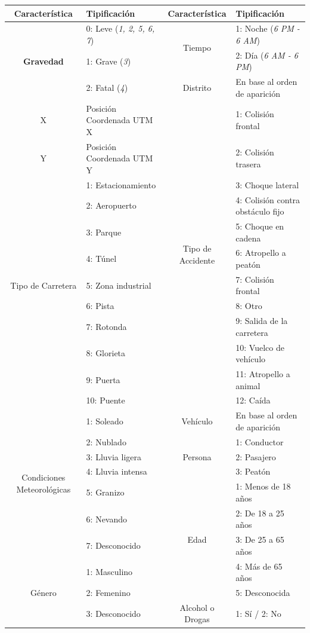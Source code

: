 \documentclass{uathesis-es}
\begin{document}
{\begin{table}[ht]
    \begin{tabular}{|c|l|c|l|}\hline
        \textbf{Característica} & \textbf{Tipificación} & \textbf{Característica} & \textbf{Tipificación} \\ \hline
        \multirow{3}{*}{\textbf{Gravedad}} & 0: Leve (\textit{1, 2, 5, 6, 7}) & \multirow{2}{*}{Tiempo} & 1: Noche (\textit{6 PM - 6 AM}) \\
        & 1: Grave (\textit{3}) & & 2: Día (\textit{6 AM - 6 PM}) \\ \cline{3-4}
        & 2: Fatal (\textit{4}) & Distrito & En base al orden de aparición \\ \hline
        \multirow{1}{*}{X} & Posición Coordenada UTM X & \multirow{12}{*}{Tipo de Accidente} & 1: Colisión frontal \\ \cline{1-2}
        \multirow{1}{*}{Y} & Posición Coordenada UTM Y & & 2: Colisión trasera \\ \cline{1-2}
        \multirow{9}{*}{Tipo de Carretera} & 1: Estacionamiento & & 3: Choque lateral \\
        & 2: Aeropuerto & & 4: Colisión contra obstáculo fijo \\
        & 3: Parque & & 5: Choque en cadena \\
        & 4: Túnel & & 6: Atropello a peatón \\
        & 5: Zona industrial & & 7: Colisión frontal \\
        & 6: Pista & & 8: Otro \\
        & 7: Rotonda & & 9: Salida de la carretera \\
        & 8: Glorieta & & 10: Vuelco de vehículo \\
        & 9: Puerta & & 11: Atropello a animal \\
        & 10: Puente & & 12: Caída \\ \hline
        \multirow{7}{*}{Condiciones Meteorológicas} & 1: Soleado & \multirow{1}{*}{Vehículo} & En base al orden de aparición \\ \cline{3-4}
        & 2: Nublado & \multirow{3}{*}{Persona} & 1: Conductor \\
        & 3: Lluvia ligera & & 2: Pasajero \\
        & 4: Lluvia intensa & & 3: Peatón \\ \cline{3-4}
        & 5: Granizo & \multirow{5}{*}{Edad} & 1: Menos de 18 años \\
        & 6: Nevando & & 2: De 18 a 25 años \\
        & 7: Desconocido & & 3: De 25 a 65 años \\ \cline{1-2}
        \multirow{3}{*}{Género} & 1: Masculino & & 4: Más de 65 años \\
        & 2: Femenino & & 5: Desconocida \\ \cline{3-4}
        & 3: Desconocido & \multirow{1}{*}{Alcohol o Drogas} & 1: Sí / 2: No\\ \hline
    \end{tabular}


\end{table}}
\end{document}
